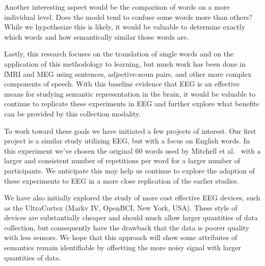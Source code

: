 Another interesting aspect would be the comparison of words on a more 
individual level. Does the model tend to confuse some words more than others?  
While we hypothesize this is likely, it would be valuable to determine exactly 
which words and how semantically similar those words are.

Lastly, this research focuses on the translation of single words and on the 
application of this methodology to learning, but much work has been done in 
fMRI and MEG using sentences, adjective-noun pairs, and other more complex 
components of speech. With this baseline evidence that EEG is an effective 
means for studying semantic representation in the brain, it would be valuable 
to continue to replicate these experiments in EEG and further explore what 
benefits can be provided by this collection modality.

To work toward these goals we have initiated a few projects of interest. Our 
first project is a similar study utilizing EEG, but with a focus on English 
words. In this experiment we've chosen the original 60 words used by Mitchell 
et al.~\cite{Mitchell2008} with a larger and consistent number of repetitions 
per word for a larger number of participants.  We anticipate this may help us 
continue to explore the adaption of these experiments to EEG in a more close 
replication of the earlier studies.

We have also initially explored the study of more cost effective EEG devices, 
such as the UltraCortex (Markv IV, OpenBCI, New York, USA). These style of 
devices are substantially cheaper and should much allow larger quantities of 
data collection, but consequently have the drawback that the data is poorer 
quality with less sensors.  We hope that this approach will show some 
attributes of semantics remain identifiable by offsetting the more noisy signal 
with larger quantities of data.
